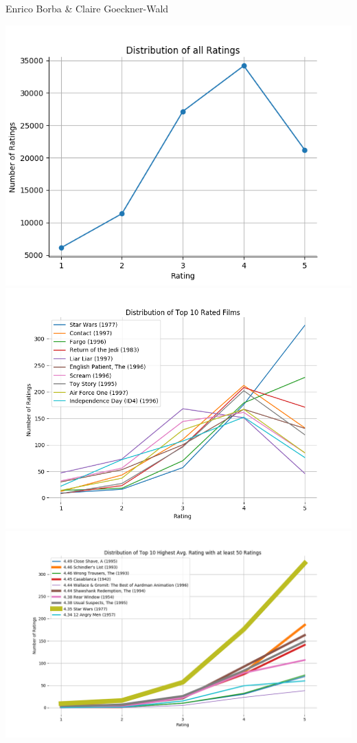 \documentclass[titlepage]{article}
\begin{document}
{Enrico Borba \& Claire Goeckner-Wald}
\begin{center}
    \includegraphics[width=\textwidth]{basic_1.png} \\
    \includegraphics[width=\textwidth]{basic_2.png} \\
    \includegraphics[width=\textwidth]{basic_3.png} \\

\end{center}
\end{document}
